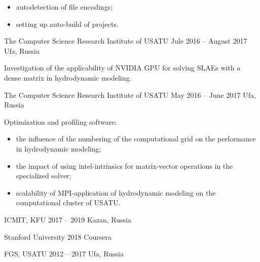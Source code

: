 \documentclass[10pt,a4paper,ragged2e,withhyper]{altacv}
\begin{document}
\begin{paracol}{2}
\begin{itemize}
  \item autodetection of file encodings;
  \smallskip

  \item setting up auto-build of projects.

\end{itemize}

\divider

{The Computer Science Research Institute of USATU}
{Jule 2016 -- August 2017}
{Ufa, Russia}

Investigation of the applicability of NVIDIA GPU for solving SLAEs with a dense matrix in hydrodynamic modeling.

\divider

{The Computer Science Research Institute of USATU}
{May 2016 -- June 2017}
{Ufa, Russia}

Optimization and profiling software:

\begin{itemize}

  \item the influence of the numbering of the computational grid on the performance in hydrodynamic modeling;
  \smallskip

  \item the impact of using intel-intrinsics for matrix-vector operations in the specialized solver;
  \smallskip

  \item scalability of MPI-application of hydrodynamic modeling on the computational cluster of USATU.

\end{itemize}

\switchcolumn




\smallskip
{}


{ICMIT, KFU}
{2017 -- 2019}
{Kazan, Russia}

\divider

{Stanford University}
{2018}
{Coursera}

\divider

{FGS, USATU}
{2012 -- 2017}
{Ufa, Russia}


\nocite{*}

\printbibliography[heading=pubtype,title={\printinfo{\faUsers}{Conference Proceedings}},type=inproceedings]

\end{paracol}
\end{document}
